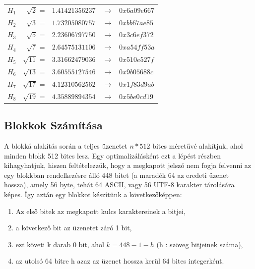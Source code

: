 \begin{tabular}{lrll}

    $H_1$  &  $\sqrt{2}$  =  & $1.41421356237$  &  $\xrightarrow{} \;\;\; 0x6a09e667 $ \\
    $H_2$  &  $\sqrt{3}$  =  & $1.73205080757$  &  $\xrightarrow{} \;\;\; 0xbb67ae85 $ \\
    $H_3$  &  $\sqrt{5}$  =  & $2.23606797750$  &  $\xrightarrow{} \;\;\; 0x3c6ef372 $ \\
    $H_4$  &  $\sqrt{7}$  =  & $2.64575131106$  &  $\xrightarrow{} \;\;\; 0xa54ff53a $ \\
    $H_5$  &  $\sqrt{11}$ =  & $3.31662479036$  &  $\xrightarrow{} \;\;\; 0x510e527f $ \\
    $H_6$  &  $\sqrt{13}$ =  & $3.60555127546$  &  $\xrightarrow{} \;\;\; 0x9b05688c $ \\
    $H_7$  &  $\sqrt{17}$ =  & $4.12310562562$  &  $\xrightarrow{} \;\;\; 0x1f83d9ab $ \\
    $H_8$  &  $\sqrt{19}$ =  & $4.35889894354$  &  $\xrightarrow{} \;\;\; 0x5be0cd19 $ \\

\end{tabular}


\bigbreak




\subsection{Blokkok Számítása}


A blokká alakítás során a teljes üzenetet $n * 512$ bites méretűvé alakítjuk, ahol minden blokk 512 bites lesz. Egy optimalizálásként ezt a lépést részben kihagyhatjuk, hiszen feltételezzük, hogy a megkapott jelszó nem fogja felvenni az egy blokkban rendelkezésre álló 448 bitet (a maradék 64 az eredeti üzenet hossza), amely 56 byte, tehát 64 ASCII, vagy 56 UTF-8 karakter tárolására képes. Így aztán egy blokkot készítünk a következőképpen:
%
\begin{enumerate}
    \itemsep-0.5em
    \item Az első bitek az megkapott kulcs karaktereinek a bitjei,
    \item a következő bit az üzenetet záró 1 bit,
    \item ezt követi k darab 0 bit, ahol $k = 448 - 1 - h$ (h : szöveg bitjeinek száma),
    \item az utolsó 64 bitre h azaz az üzenet hossza kerül 64 bites integerként.
\end{enumerate}



